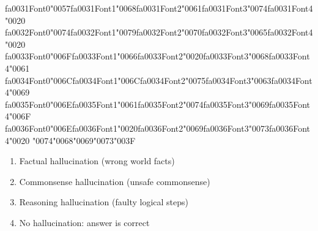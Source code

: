 \documentclass[12pt]{article}
\begin{document}
\begin{enumerate}[label=Q\arabic*.]
{\csname fa0031Font0\endcsname\char"0057}{\csname fa0031Font1\endcsname\char"0068}{\csname fa0031Font2\endcsname\char"0061}{\csname fa0031Font3\endcsname\char"0074}{\csname fa0031Font4\endcsname\char"0020} {\csname fa0032Font0\endcsname\char"0074}{\csname fa0032Font1\endcsname\char"0079}{\csname fa0032Font2\endcsname\char"0070}{\csname fa0032Font3\endcsname\char"0065}{\csname fa0032Font4\endcsname\char"0020} {\csname fa0033Font0\endcsname\char"006F}{\csname fa0033Font1\endcsname\char"0066}{\csname fa0033Font2\endcsname\char"0020}{\csname fa0033Font3\endcsname\char"0068}{\csname fa0033Font4\endcsname\char"0061} {\csname fa0034Font0\endcsname\char"006C}{\csname fa0034Font1\endcsname\char"006C}{\csname fa0034Font2\endcsname\char"0075}{\csname fa0034Font3\endcsname\char"0063}{\csname fa0034Font4\endcsname\char"0069} {\csname fa0035Font0\endcsname\char"006E}{\csname fa0035Font1\endcsname\char"0061}{\csname fa0035Font2\endcsname\char"0074}{\csname fa0035Font3\endcsname\char"0069}{\csname fa0035Font4\endcsname\char"006F} {\csname fa0036Font0\endcsname\char"006E}{\csname fa0036Font1\endcsname\char"0020}{\csname fa0036Font2\endcsname\char"0069}{\csname fa0036Font3\endcsname\char"0073}{\csname fa0036Font4\endcsname\char"0020} {\char"0074}{\char"0068}{\char"0069}{\char"0073}{\char"003F}
\begin{enumerate}[label=(\Alph*)]
    \item Factual hallucination (wrong world facts)
    \item Commonsense hallucination (unsafe commonsense)
    \item Reasoning hallucination (faulty logical steps)
    \item No hallucination: answer is correct
\end{enumerate}

\end{enumerate}
\end{document}
